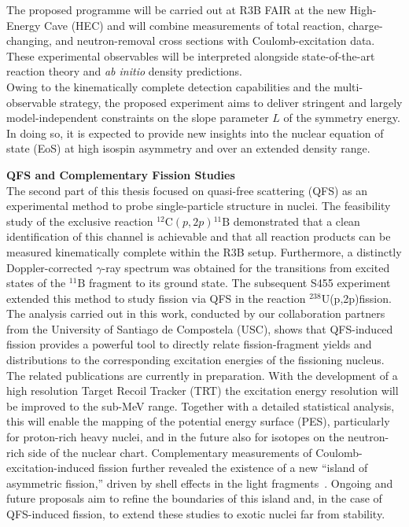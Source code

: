The proposed programme will be carried out at R3B \@ FAIR at the new High-Energy Cave (HEC) and will combine measurements of total reaction, charge-changing, and neutron-removal cross sections with Coulomb-excitation data. These experimental observables will be interpreted alongside state-of-the-art reaction theory and \emph{ab initio} density predictions.\\
Owing to the kinematically complete detection capabilities and the multi-observable strategy, the proposed experiment aims to deliver stringent and largely model-independent constraints on the slope parameter \(L\) of the symmetry energy. In doing so, it is expected to provide new insights into the nuclear equation of state (EoS) at high isospin asymmetry and over an extended density range.

\textbf{QFS and Complementary Fission Studies}\\
The second part of this thesis focused on quasi-free scattering (QFS) as an experimental method to probe single-particle structure in nuclei. The feasibility study of the exclusive reaction ${}^{12}\mathrm{C}(p,2p){}^{11}\mathrm{B}$ demonstrated that a clean identification of this channel is achievable and that all reaction products can be measured kinematically complete within the R3B setup. Furthermore, a distinctly Doppler-corrected $\gamma$-ray spectrum was obtained for the transitions from excited states of the ${}^{11}\mathrm{B}$ fragment to its ground state. The subsequent S455 experiment extended this method to study fission via QFS in the reaction $^{238}$U(p,2p)fission. The analysis carried out in this work, conducted by our collaboration partners from the University of Santiago de Compostela (USC), shows that QFS-induced fission provides a powerful tool to directly relate fission-fragment yields and distributions to the corresponding excitation energies of the fissioning nucleus. The related publications are currently in preparation. With the development of a high resolution Target Recoil Tracker (TRT) the excitation energy resolution will be improved to the sub-MeV range. Together with a detailed statistical analysis, this will enable the mapping of the potential energy surface (PES), particularly for proton-rich heavy nuclei, and in the future also for isotopes on the neutron-rich side of the nuclear chart. Complementary measurements of Coulomb-excitation-induced fission further revealed the existence of a new “island of asymmetric fission,” driven by shell effects in the light fragments~\cite{morfouace2025asymmetric}. Ongoing and future proposals aim to refine the boundaries of this island and, in the case of QFS-induced fission, to extend these studies to exotic nuclei far from stability.\\

